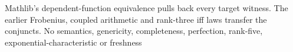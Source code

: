 \documentclass[11pt,oneside]{article}
\theoremstyle{definition}
\theoremstyle{remark}
\begin{document}
Mathlib's dependent-function equivalence pulls back every target witness. The earlier
Frobenius, coupled arithmetic and rank-three iff laws transfer the conjuncts. No semantics,
genericity, completeness, perfection, rank-five, exponential-characteristic or freshness
\end{document}
